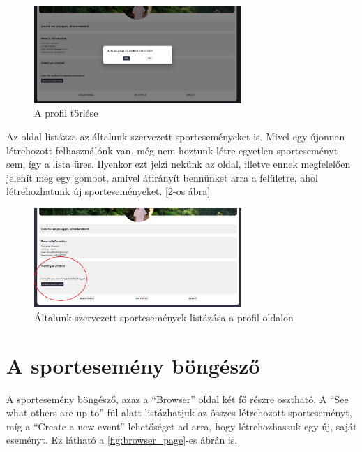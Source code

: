 \begin{figure}
	\centering
	\includegraphics[width=0.7\textwidth]{images/delete_profile.png}
	\caption{A profil törlése}
	\label{fig:delete_profile}
\end{figure}

Az oldal listázza az általunk szervezett sporteseményeket is. Mivel egy újonnan létrehozott felhasználónk van, még nem hoztunk létre egyetlen
sporteseményt sem, így a lista üres. Ilyenkor ezt jelzi nekünk az oldal, illetve ennek megfelelően jelenít meg egy gombot, amivel átirányít
bennünket arra a felületre, ahol létrehozhatunk új sporteseményeket. [\ref{fig:profile_page_2}-os ábra]

\begin{figure}[h]
	\centering
	\includegraphics[width=0.7\textwidth]{images/events_by_you_profile.png}
	\caption{Általunk szervezett sportesemények listázása a profil oldalon}
	\label{fig:profile_page_2}
\end{figure}

\section{A sportesemény böngésző}

A sportesemény böngésző, azaz a ``Browser'' oldal két fő részre osztható. A ``See what others are up to'' fül alatt listázhatjuk az összes
létrehozott sporteseményt, míg a ``Create a new event'' lehetőséget ad arra, hogy létrehozhassuk egy új, saját eseményt.
Ez látható a \ref{fig:browser_page}-es ábrán is.

\newpage

